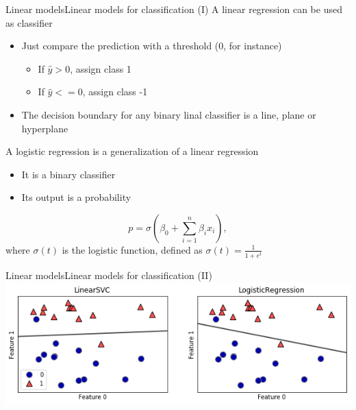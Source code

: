 \documentclass[10pt,compress]{beamer} %
\begin{document}
\begin{frame}{Linear models}{Linear models for classification (I)}
    A linear regression can be used as classifier
	\begin{itemize}
		\item Just compare the prediction with a threshold (0, for instance)
            \begin{itemize}
                \item If $\hat{y} > 0$, assign class 1
                \item If $\hat{y} <= 0$, assign class -1
            \end{itemize}
        \item The decision boundary for any binary linal classifier is a line, plane or hyperplane
	\end{itemize}

    A \alert{logistic regression} is a generalization of a linear regression
    \begin{itemize}
        \item It is a binary classifier
        \item Its output is a probability
    \end{itemize}
    \begin{equation*}
        p = \sigma\left(\beta_0+\sum_{i=1}^{n} \beta_i x_i\right),
    \end{equation*}
    where $\sigma(t)$ is the logistic function, defined as $\sigma(t) = \frac{1}{1 + e^t}$

    \vspace{-3cm}
    \flushright
\end{frame}

\begin{frame}{Linear models}{Linear models for classification (II)}
    \centering \includegraphics[width=0.8\linewidth]{figs/logistic.png}
\end{frame}
\end{document}
